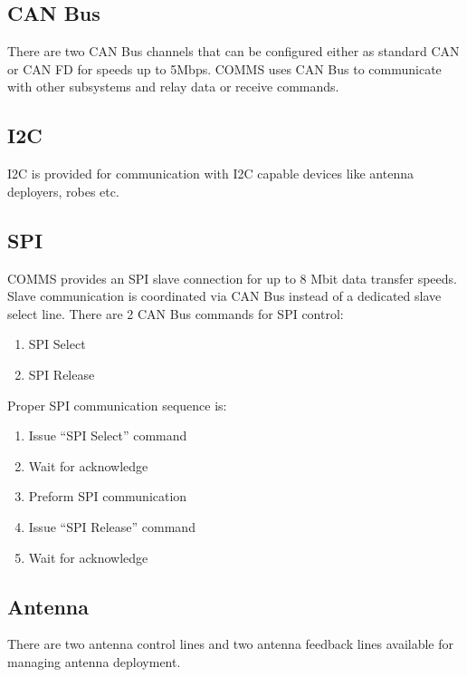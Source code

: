 \documentclass[english,title,a4paper]{report}
\begin{document}
\subsection{CAN Bus}\label{can-bus}

There are two CAN Bus channels that can be configured either as standard CAN or CAN FD for speeds up to 5Mbps.
COMMS uses CAN Bus to communicate with other subsystems and relay data or receive commands.

\subsection{I2C}\label{i2c}

I2C is provided for communication with I2C capable devices like antenna deployers, robes etc.

\subsection{SPI}\label{spi}

COMMS provides an SPI slave connection for up to 8 Mbit data transfer speeds.
Slave communication is coordinated via CAN Bus instead of a dedicated slave select line.
There are 2 CAN Bus commands for SPI control:

\begin{enumerate}
\def\labelenumi{\arabic{enumi}.}
  \item SPI Select
  \item SPI Release
\end{enumerate}

Proper SPI communication sequence is:

\begin{enumerate}
\def\labelenumi{\arabic{enumi}.}
  \item Issue ``SPI Select'' command
  \item Wait for acknowledge
  \item Preform SPI communication
  \item Issue ``SPI Release'' command
  \item Wait for acknowledge
\end{enumerate}

\subsection{Antenna}\label{antenna}

There are two antenna control lines and two antenna feedback lines available for managing antenna deployment.
\end{document}
